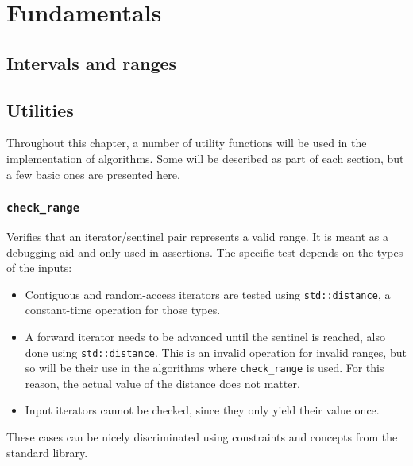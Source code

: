 \section{Fundamentals}

\subsection{Intervals and ranges}
\label{subsec:algo:ranges}

\subsection{Utilities}

Throughout this chapter, a number of utility functions will be used in the
implementation of algorithms.  Some will be described as part of each section,
but a few basic ones are presented here.

\subsubsection{\texttt{check\_range}}

Verifies that an iterator/sentinel pair represents a valid range.  It is meant
as a debugging aid and only used in assertions.  The specific test depends on
the types of the inputs:

\begin{itemize}
    \item
        Contiguous and random-access iterators are tested using
        \texttt{std::distance}, a constant-time operation for those types.
    \item
        A forward iterator needs to be advanced until the sentinel is reached,
        also done using \texttt{std::distance}.  This is an invalid operation
        for invalid ranges, but so will be their use in the algorithms where
        \texttt{check\_range} is used.  For this reason, the actual value of the
        distance does not matter.
    \item
        Input iterators cannot be checked, since they only yield their value
        once.
\end{itemize}

These cases can be nicely discriminated using constraints and concepts from the
standard library.


\vspace{-\baselineskip}

